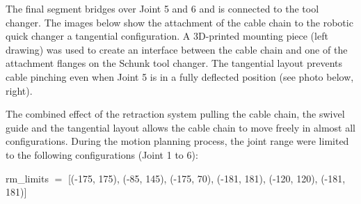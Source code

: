 \documentclass[11pt]{book}
\begin{document}
The final segment bridges over Joint 5 and 6 and is connected to the tool changer. The images below show the attachment of the cable chain to the robotic quick changer a tangential configuration. A 3D-printed mounting piece (left drawing) was used to create an interface between the cable chain and one of the attachment flanges on the Schunk tool changer. The tangential layout prevents cable pinching even when Joint 5 is in a fully deflected position (see photo below, right). 

The combined effect of the retraction system pulling the cable chain, the swivel guide and the tangential layout allows the cable chain to move freely in almost all configurations. During the motion planning process, the joint range were limited to the following configurations (Joint 1 to 6):

{\footnotesize rm\_limits $=$ [(-175, 175), (-85, 145), (-175, 70), (-181, 181), (-120, 120), (-181, 181)]}
\end{document}
